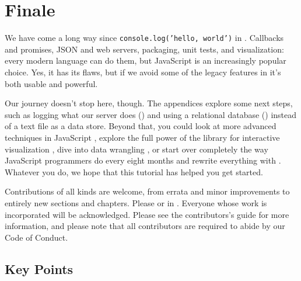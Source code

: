 \chapter{Finale}\label{s:finale}

We have come a long way since \texttt{console.log('hello,\ world')} in .
Callbacks and promises,
JSON and web servers,
packaging, unit tests, and visualization:
every modern language can do them,
but JavaScript is an increasingly popular choice.
Yes,
it has its flaws,
but if we avoid some of the legacy features in 
it's both usable and powerful.

Our journey doesn't stop here, though.
The appendices explore some next steps,
such as logging what our server does ()
and using a relational database () instead of a text file
as a data store.
Beyond that,
you could look at more advanced techniques in JavaScript \cite{Have2018},
explore the full power of the  library for interactive visualization \cite{Meek2017},
dive into data wrangling \cite{Davi2018},
or start over completely the way JavaScript programmers do every eight months
and rewrite everything with .
Whatever you do,
we hope that this tutorial has helped you get started.

Contributions of all kinds are welcome,
from errata and minor improvements to entirely new sections and chapters.
Please 
or 
in .
Everyone whose work is incorporated will be acknowledged.
Please see the contributors's guide for more information,
and please note that all contributors are required to abide by
our Code of Conduct.

\section*{Key Points}



